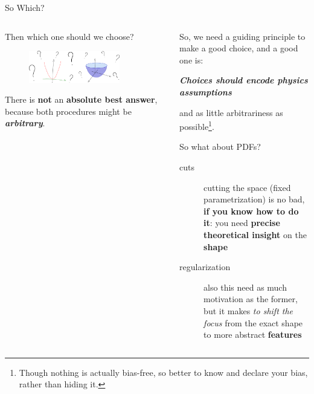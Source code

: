 \documentclass[9pt]{beamer}
\begin{document}
\begin{frame}{So Which?}
    \vspace*{30pt}
    \begin{columns}
        \begin{column}{0.5\textwidth}
            Then which one should we choose?
            \vspace*{10pt}

            \begin{figure}
                \centering
                \includegraphics[width=0.8\textwidth]{choice}
            \end{figure}

            \vspace*{10pt}
            There is \textbf{not} an \alert{\textbf{absolute best answer}},
            because both procedures might be \textit{\textbf{arbitrary}}.
        \end{column}
        \begin{column}{0.5\textwidth}
            So, we need a guiding principle to make a good choice, and a good one is:
            \begin{center}
                \itshape
                \bfseries
                Choices should encode physics assumptions
            \end{center}
            and as little arbitrariness as possible\footnote{
                Though nothing is actually bias-free, so better to know and
                declare your bias, rather than hiding it.
            }.

            \vspace*{20pt}
            So what about PDFs?
            \begin{description}
                \item[cuts] cutting the space (fixed parametrization) is no
                    bad, \textbf{if you know how to do it}: you need
                    \alert{\textbf{precise theoretical insight}} on the
                    \alert{\textbf{\pdf shape}}
                \item[regularization] also this need as much motivation as the
                    former, but it makes \textit{to shift the focus} from the
                    exact shape to more abstract \alert{\textbf{features}}
            \end{description}
            \vspace*{20pt}
        \end{column}
    \end{columns}
\end{frame}
\end{document}
